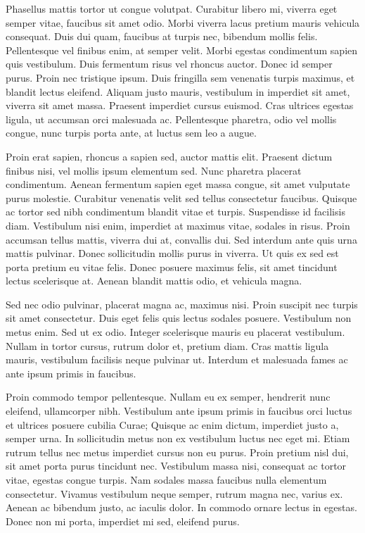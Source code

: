 \documentclass[a4paper,twoside,notitlepage,openright,11pt]{report}
\begin{document}
Phasellus mattis tortor ut congue volutpat. Curabitur libero mi, viverra eget semper vitae, faucibus sit amet odio. Morbi viverra lacus pretium mauris vehicula consequat. Duis dui quam, faucibus at turpis nec, bibendum mollis felis. Pellentesque vel finibus enim, at semper velit. Morbi egestas condimentum sapien quis vestibulum. Duis fermentum risus vel rhoncus auctor. Donec id semper purus. Proin nec tristique ipsum. Duis fringilla sem venenatis turpis maximus, et blandit lectus eleifend. Aliquam justo mauris, vestibulum in imperdiet sit amet, viverra sit amet massa. Praesent imperdiet cursus euismod. Cras ultrices egestas ligula, ut accumsan orci malesuada ac. Pellentesque pharetra, odio vel mollis congue, nunc turpis porta ante, at luctus sem leo a augue.

Proin erat sapien, rhoncus a sapien sed, auctor mattis elit. Praesent dictum finibus nisi, vel mollis ipsum elementum sed. Nunc pharetra placerat condimentum. Aenean fermentum sapien eget massa congue, sit amet vulputate purus molestie. Curabitur venenatis velit sed tellus consectetur faucibus. Quisque ac tortor sed nibh condimentum blandit vitae et turpis. Suspendisse id facilisis diam. Vestibulum nisi enim, imperdiet at maximus vitae, sodales in risus. Proin accumsan tellus mattis, viverra dui at, convallis dui. Sed interdum ante quis urna mattis pulvinar. Donec sollicitudin mollis purus in viverra. Ut quis ex sed est porta pretium eu vitae felis. Donec posuere maximus felis, sit amet tincidunt lectus scelerisque at. Aenean blandit mattis odio, et vehicula magna.

Sed nec odio pulvinar, placerat magna ac, maximus nisi. Proin suscipit nec turpis sit amet consectetur. Duis eget felis quis lectus sodales posuere. Vestibulum non metus enim. Sed ut ex odio. Integer scelerisque mauris eu placerat vestibulum. Nullam in tortor cursus, rutrum dolor et, pretium diam. Cras mattis ligula mauris, vestibulum facilisis neque pulvinar ut. Interdum et malesuada fames ac ante ipsum primis in faucibus.

Proin commodo tempor pellentesque. Nullam eu ex semper, hendrerit nunc eleifend, ullamcorper nibh. Vestibulum ante ipsum primis in faucibus orci luctus et ultrices posuere cubilia Curae; Quisque ac enim dictum, imperdiet justo a, semper urna. In sollicitudin metus non ex vestibulum luctus nec eget mi. Etiam rutrum tellus nec metus imperdiet cursus non eu purus. Proin pretium nisl dui, sit amet porta purus tincidunt nec. Vestibulum massa nisi, consequat ac tortor vitae, egestas congue turpis. Nam sodales massa faucibus nulla elementum consectetur. Vivamus vestibulum neque semper, rutrum magna nec, varius ex. Aenean ac bibendum justo, ac iaculis dolor. In commodo ornare lectus in egestas. Donec non mi porta, imperdiet mi sed, eleifend purus.
\end{document}

